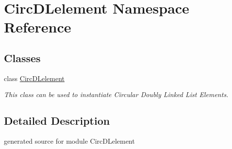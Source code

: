 \hypertarget{namespace_circ_d_lelement}{}\section{Circ\+D\+Lelement Namespace Reference}
\label{namespace_circ_d_lelement}
\subsection*{Classes}
\begin{DoxyCompactItemize}
\item 
class \hyperlink{class_circ_d_lelement_1_1_circ_d_lelement}{Circ\+D\+Lelement}
\begin{DoxyCompactList}\small\item\em This class can be used to instantiate Circular Doubly Linked List Elements. \end{DoxyCompactList}\end{DoxyCompactItemize}


\subsection{Detailed Description}
\begin{DoxyVerb}generated source for module CircDLelement \end{DoxyVerb}
 